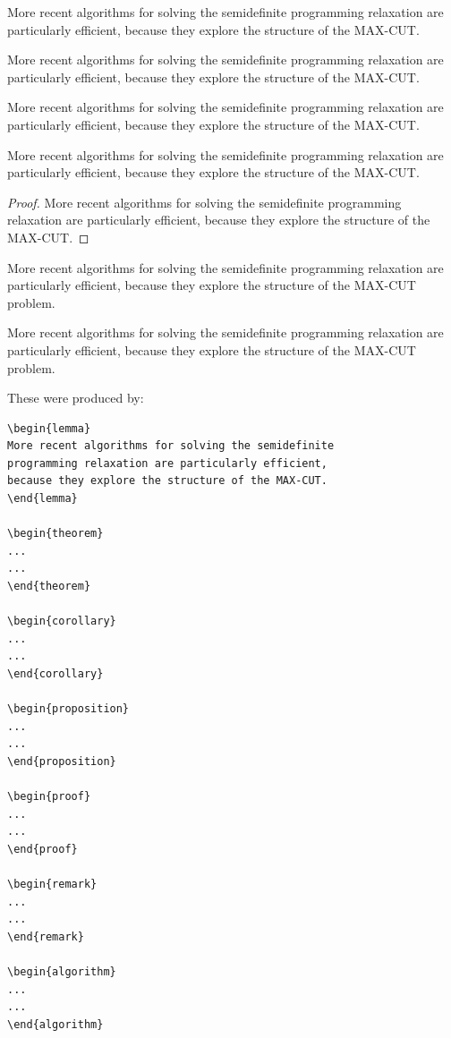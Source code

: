\documentclass[]{cJEN2e}
\begin{document}
\begin{lemma}
More recent algorithms for solving the semidefinite programming
relaxation are particularly efficient, because they explore the structure
of the MAX-CUT.
\end{lemma}
\begin{theorem}
More recent algorithms for solving the semidefinite programming
relaxation are particularly efficient, because they explore the structure
of the MAX-CUT.
\end{theorem}
\begin{corollary}
More recent algorithms for solving the semidefinite programming
relaxation are particularly efficient, because they explore the
structure of the MAX-CUT.
\end{corollary}
\begin{proposition}
More recent algorithms for solving the semidefinite programming
relaxation are particularly efficient, because they explore the structure
of the MAX-CUT.
\end{proposition}
\begin{proof}
More recent algorithms for solving the semidefinite programming
relaxation are particularly efficient, because they explore the structure
of the MAX-CUT.
\end{proof}
\begin{remark}
More recent algorithms for solving the semidefinite programming
relaxation are particularly efficient, because they explore the
structure of the MAX-CUT problem.
\end{remark}
\begin{algorithm}
More recent algorithms for solving the semidefinite programming
relaxation are particularly efficient, because they explore the
structure of the MAX-CUT problem.
\end{algorithm}

\noindent These were produced by:
\begin{verbatim}
\begin{lemma}
More recent algorithms for solving the semidefinite
programming relaxation are particularly efficient,
because they explore the structure of the MAX-CUT.
\end{lemma}

\begin{theorem}
...
...
\end{theorem}

\begin{corollary}
...
...
\end{corollary}

\begin{proposition}
...
...
\end{proposition}

\begin{proof}
...
...
\end{proof}

\begin{remark}
...
...
\end{remark}

\begin{algorithm}
...
...
\end{algorithm}

\end{verbatim}
\end{document}
